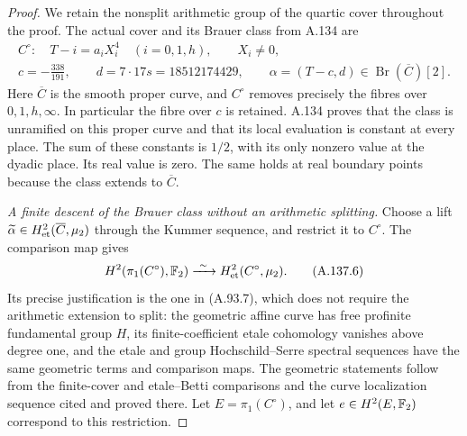 \begin{proof}
We retain the nonsplit arithmetic group of the
quartic cover throughout the proof.
The actual cover and its Brauer class from A.134 are
\[
 \begin{gathered}
 C^\circ:\quad T-i=a_iX_i^4\quad(i=0,1,h),\qquad X_i\ne0,\\
 c=-\frac{338}{191},\qquad d=7\cdot17s=18512174429,\qquad
 \alpha=(T-c,d)\in\operatorname{Br}(\overline C)[2].
 \end{gathered}
\tag{A.137.5}
\]
Here \(\overline C\) is the smooth proper curve, and
\(C^\circ\) removes precisely the fibres over
\(0,1,h,\infty\).  In particular the fibre over \(c\)
is retained.  A.134 proves that the class is unramified
on this proper curve and that its local evaluation is
constant at every place.  The sum of these constants is
\(1/2\), with its only nonzero value at the dyadic place.
Its real value is zero.  The same holds at real boundary
points because the class extends to \(\overline C\).

\emph{A finite descent of the Brauer class without an arithmetic splitting.}
Choose a lift \(\widetilde\alpha\in
H^2_{\rm et}(\overline C,\mu_2)\) through the Kummer
sequence, and restrict it to \(C^\circ\).
The comparison map gives
\[
 H^2(\pi_1(C^\circ),\mathbb F_2)
       \xrightarrow{\ \sim\ }
 H^2_{\rm et}(C^\circ,\mu_2).
\tag{A.137.6}
\]
Its precise justification is the one in (A.93.7),
which does not require the arithmetic extension to
split: the geometric affine curve has free profinite
fundamental group \(H\), its finite-coefficient etale
cohomology vanishes above degree one, and the etale
and group Hochschild--Serre spectral sequences have
the same geometric terms and comparison maps.
The geometric statements follow from the finite-cover
and etale--Betti comparisons and the curve localization
sequence cited and proved there.
Let \(E=\pi_1(C^\circ)\), and let
\(e\in H^2(E,\mathbb F_2)\) correspond to this restriction.


\end{proof}
